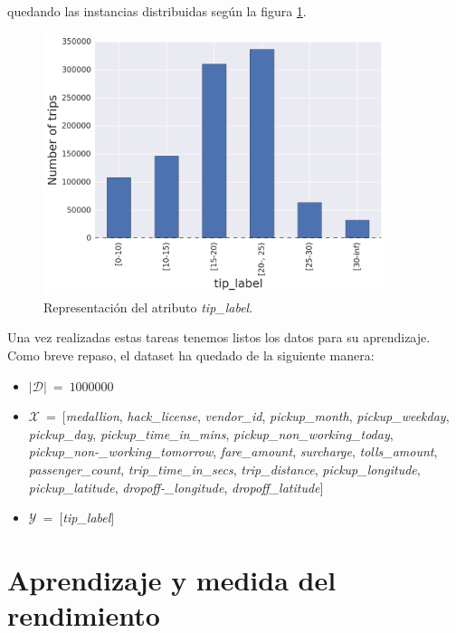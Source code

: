 \noindent

quedando las instancias distribuidas según la figura \ref{fig:5.12}.

\begin{figure}[ht]
  \centering
  \includegraphics[width=100mm]{figures/ch_05/tip_label_1.png}
  \caption{Representación del atributo \emph{tip\_label}.}
  \label{fig:5.12}
\end{figure}

\pagebreak

Una vez realizadas estas tareas tenemos listos los datos para su aprendizaje. Como breve repaso, el dataset ha quedado de la siguiente manera:

\vspace*{-5mm}

\begin{itemize}
\item[\textbullet]$|\mathcal{D}|\:=\:1000000$

\item[\textbullet]$\mathcal{X}\:=\:[$\emph{medallion}, \emph{hack\_license}, \emph{vendor\_id}, \emph{pickup\_month}, \emph{pickup\_weekday}, \emph{pickup\_day}, \emph{pickup\_time\_in\_mins}, \emph{pickup\_non\_working\_today}, \emph{pickup\_non-\_working\_tomorrow}, \emph{fare\_amount}, \emph{surcharge}, \emph{tolls\_amount}, \emph{passenger\_count}, \emph{trip\_time\_in\_secs}, \emph{trip\_distance}, \emph{pickup\_longitude}, \emph{pickup\_latitude}, \emph{dropoff-\_longitude}, \emph{dropoff\_latitude}$]$

\item[\textbullet]$\mathcal{Y}\:=\:[$\emph{tip\_label}$]$
\end{itemize}

\vspace*{5mm}

\section{Aprendizaje y medida del rendimiento} \label{sec:5.3}

